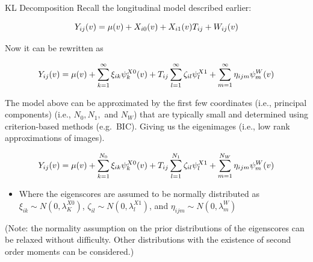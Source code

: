 \documentclass[
  ignorenonframetext,
]{beamer}
\providecommand{\tightlist}{%
  \setlength{\itemsep}{0pt}\setlength{\parskip}{0pt}}
\begin{document}
\begin{frame}{KL Decomposition}
\protect\hypertarget{kl-decomposition-1}{}
Recall the longitudinal model described earlier:

\[
Y_{ij}(v) = \mu(v) + X_{i0}(v) + X_{i1}(v)T_{ij} + W_{ij}(v) \\
\]

Now it can be rewritten as

\[
Y_{ij}(v)=\mu(v) +\sum^{\infty}_{k=1} \xi_{ik} \psi_{k}^{X0}(v) + T_{ij}\sum^{\infty}_{l=1} \zeta_{il} \psi_{l}^{X1}+\sum^{\infty}_{m=1} \eta_{ijm} \psi_{m}^{W}(v) \\
\]

The model above can be approximated by the first few coordinates (i.e.,
principal components) (i.e., \(N_0 , N_1,\) and \(N_W\)) that are
typically small and determined using criterion-based methods (e.g.~BIC).
Giving us the eigenimages (i.e., low rank approximations of images).

\[
Y_{ij}(v)=\mu(v) +\sum^{N_0}_{k=1} \xi_{ik} \psi_{k}^{X0}(v) + T_{ij}\sum^{N_1}_{l=1} \zeta_{il} \psi_{l}^{X1}+\sum^{N_W}_{m=1} \eta_{ijm} \psi_{m}^{W}(v) \\
\]

\begin{itemize}
\tightlist
\item
  Where the eigenscores are assumed to be normally distributed as
  \(\xi_{ik} \sim N(0,\lambda_K^{X0})\),
  \(\zeta_{il} \sim N(0,\lambda_l^{X1})\), and
  \(\eta_{ijm} \sim N(0,\lambda_m^{W})\)
\end{itemize}

(Note: the normality assumption on the prior distributions of the
eigenscores can be relaxed without difficulty. Other distributions with
the existence of second order moments can be considered.)
\end{frame}
\end{document}
